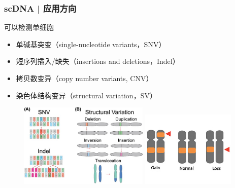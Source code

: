 \documentclass[11pt]{ctexbeamer}
\begin{document}
\begin{frame}
  \frametitle{scDNA | 应用方向}
  \begin{block}{可以检测单细胞}
    \begin{itemize}
      \item 单碱基突变（single-nucleotide variants，SNV）
      \item 短序列插入/缺失（insertions and deletions，Indel）
      \item \alert{拷贝数变异（copy number variants, CNV）}
      \item 染色体结构变异（structural variation，SV）
    \end{itemize}
  \end{block}
  \begin{figure}
    \centering
    \includegraphics[width=0.55\textwidth]{scDNA_var_02.png}\quad
    \includegraphics[width=0.4\textwidth]{scDNA_var_09.png}
  \end{figure}
\end{frame}
\end{document}
